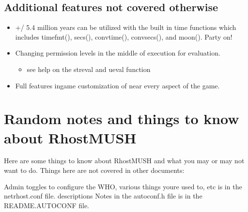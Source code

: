 \documentclass[letterpaper,10pt,english]{sphinxmanual}
\begin{document}
\subsection{Additional features not covered otherwise}
\label{\detokenize{features:additional-features-not-covered-otherwise}}\begin{itemize}
\item {} 
\sphinxAtStartPar
+/\sphinxhyphen{} 5.4 million years can be utilized with the built in time functions
which includes timefmt(), secs(), convtime(), convsecs(), and moon().  Party on!

\item {} 
\sphinxAtStartPar
Changing permission levels in the middle of execution for evaluation.
\begin{itemize}
\item {} 
\sphinxAtStartPar
see help on the streval and ueval function\textquotesingle{}

\end{itemize}

\item {} 
\sphinxAtStartPar
Full features in\sphinxhyphen{}game customization of near every aspect of the game.

\end{itemize}


\section{Random notes and things to know about RhostMUSH}
\label{\detokenize{features:random-notes-and-things-to-know-about-rhostmush}}
\sphinxAtStartPar
Here are some things to know about RhostMUSH and what you may or may not
want to do.  Things here are not covered in other documents:

\sphinxAtStartPar
Admin toggles to configure the WHO, various things you\textquotesingle{}re used to, etc is in the
\textquotesingle{}netrhost.conf\textquotesingle{} file.  descriptions Notes in the autoconf.h file is in the
README.AUTOCONF file.
\end{document}
